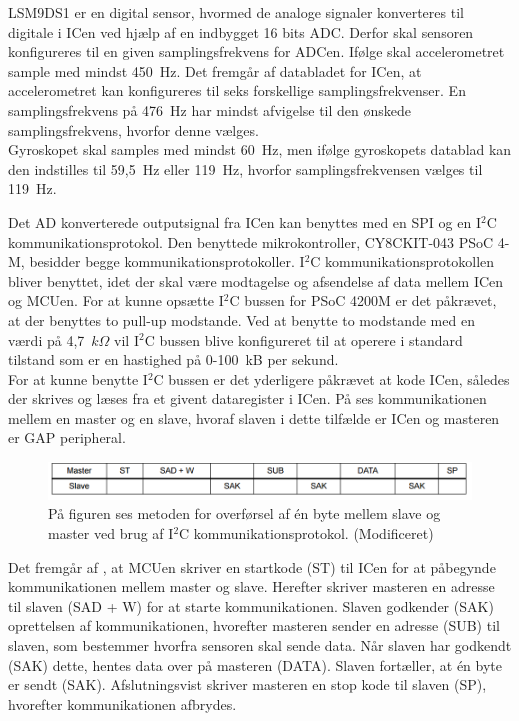 LSM9DS1 er en digital sensor, hvormed de analoge signaler konverteres til digitale i ICen ved hjælp af en indbygget 16 bits ADC. Derfor skal sensoren konfigureres til en given samplingsfrekvens for ADCen. Ifølge  skal accelerometret sample med mindst 450~Hz. Det fremgår af databladet for ICen, at accelerometret kan konfigureres til seks forskellige samplingsfrekvenser. En samplingsfrekvens på 476~Hz har mindst afvigelse til den ønskede samplingsfrekvens, hvorfor denne vælges. \\
Gyroskopet skal samples med mindst 60~Hz, men ifølge gyroskopets datablad kan den indstilles til 59,5~Hz eller 119~Hz, hvorfor samplingsfrekvensen vælges til 119~Hz.

Det AD konverterede outputsignal fra ICen kan benyttes med en SPI og en I$^{2}$C kommunikationsprotokol. Den benyttede mikrokontroller, CY8CKIT-043 PSoC 4-M, besidder begge kommunikationsprotokoller. I$^{2}$C kommunikationsprotokollen bliver benyttet, idet der skal være modtagelse og afsendelse af data mellem ICen og MCUen. For at kunne opsætte I$^{2}$C bussen for PSoC 4200M er det påkrævet, at der benyttes to pull-up modstande. Ved at benytte to modstande med en værdi på 4,7~$k\Omega$ vil I$^{2}$C bussen blive konfigureret til at operere i standard tilstand som er en hastighed på 0-100~kB per sekund. \citep{CYPRESS2016} \\
For at kunne benytte I$^{2}$C bussen er det yderligere påkrævet at kode ICen, således der skrives og læses fra et givent dataregister i ICen. På  ses kommunikationen mellem en master og en slave, hvoraf slaven i dette tilfælde er ICen og masteren er GAP peripheral. 
\begin{figure}[H]
	\centering
	\includegraphics[scale=0.75]{figures/cDesign/Sensor_write_read2.png}
	\caption{På figuren ses metoden for overførsel af én byte mellem slave og master ved brug af I$^{2}$C kommunikationsprotokol. \citep{STMicroelectronics2016} (Modificeret)}
	\label{Fig:master_slave}
\end{figure}\vspace{-0.25cm}
Det fremgår af , at MCUen skriver en startkode (ST) til ICen for at påbegynde kommunikationen mellem master og slave. Herefter skriver masteren en adresse til slaven (SAD + W) for at starte kommunikationen. Slaven godkender (SAK) oprettelsen af kommunikationen, hvorefter masteren sender en adresse (SUB) til slaven, som bestemmer hvorfra sensoren skal sende data. Når slaven har godkendt (SAK) dette, hentes data over på masteren (DATA). Slaven fortæller, at én byte er sendt (SAK). Afslutningsvist skriver masteren en stop kode til slaven (SP), hvorefter kommunikationen afbrydes.

